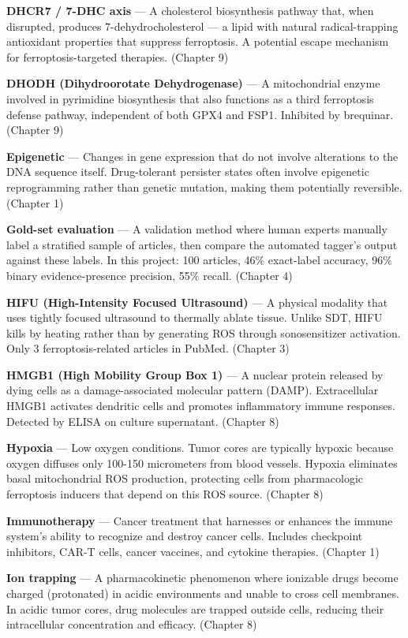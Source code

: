 \documentclass[11pt,twoside,openright]{report}
\begin{document}
\textbf{DHCR7 / 7-DHC axis} --- A cholesterol biosynthesis pathway that, when disrupted, produces 7-dehydrocholesterol --- a lipid with natural radical-trapping antioxidant properties that suppress ferroptosis. A potential escape mechanism for ferroptosis-targeted therapies. (Chapter 9)

\textbf{DHODH (Dihydroorotate Dehydrogenase)} --- A mitochondrial enzyme involved in pyrimidine biosynthesis that also functions as a third ferroptosis defense pathway, independent of both GPX4 and FSP1. Inhibited by brequinar. (Chapter 9)

\textbf{Epigenetic} --- Changes in gene expression that do not involve alterations to the DNA sequence itself. Drug-tolerant persister states often involve epigenetic reprogramming rather than genetic mutation, making them potentially reversible. (Chapter 1)

\textbf{Gold-set evaluation} --- A validation method where human experts manually label a stratified sample of articles, then compare the automated tagger's output against these labels. In this project: 100 articles, 46\% exact-label accuracy, 96\% binary evidence-presence precision, 55\% recall. (Chapter 4)

\textbf{HIFU (High-Intensity Focused Ultrasound)} --- A physical modality that uses tightly focused ultrasound to thermally ablate tissue. Unlike SDT, HIFU kills by heating rather than by generating ROS through sonosensitizer activation. Only 3 ferroptosis-related articles in PubMed. (Chapter 3)

\textbf{HMGB1 (High Mobility Group Box 1)} --- A nuclear protein released by dying cells as a damage-associated molecular pattern (DAMP). Extracellular HMGB1 activates dendritic cells and promotes inflammatory immune responses. Detected by ELISA on culture supernatant. (Chapter 8)

\textbf{Hypoxia} --- Low oxygen conditions. Tumor cores are typically hypoxic because oxygen diffuses only 100-150 micrometers from blood vessels. Hypoxia eliminates basal mitochondrial ROS production, protecting cells from pharmacologic ferroptosis inducers that depend on this ROS source. (Chapter 8)

\textbf{Immunotherapy} --- Cancer treatment that harnesses or enhances the immune system's ability to recognize and destroy cancer cells. Includes checkpoint inhibitors, CAR-T cells, cancer vaccines, and cytokine therapies. (Chapter 1)

\textbf{Ion trapping} --- A pharmacokinetic phenomenon where ionizable drugs become charged (protonated) in acidic environments and unable to cross cell membranes. In acidic tumor cores, drug molecules are trapped outside cells, reducing their intracellular concentration and efficacy. (Chapter 8)
\end{document}
